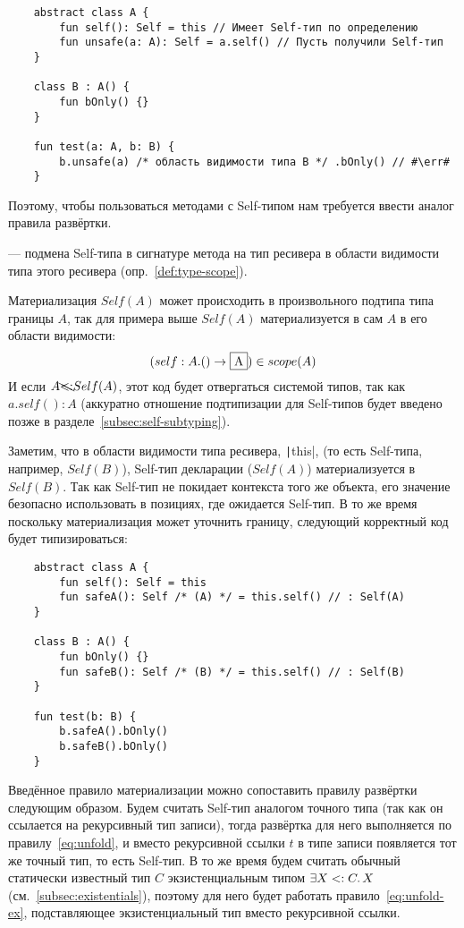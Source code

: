\begin{verbatim}
    abstract class A {
        fun self(): Self = this // Имеет Self-тип по определению
        fun unsafe(a: A): Self = a.self() // Пусть получили Self-тип
    }

    class B : A() {
        fun bOnly() {}
    }

    fun test(a: A, b: B) {
        b.unsafe(a) /* область видимости типа B */ .bOnly() // #\err#
    }
\end{verbatim}

Поэтому, чтобы пользоваться методами с Self-типом нам требуется ввести аналог правила развёртки.

\begin{definition}
    \label{def:materialization}
     --- подмена Self-типа в сигнатуре метода на тип ресивера в области видимости типа этого ресивера (опр.~\ref{def:type-scope}).
\end{definition}

Материализация $Self(A)$ может происходить в произвольного подтипа типа границы $A$, так для примера выше $Self(A)$ материализуется в сам $A$ в его области видимости:
\[(self : A.() \to \framebox{A}) \in scope(A)\]
И если $A \bcancel{<:} Self(A)$, этот код будет отвергаться системой типов, так как $a.self() : A$ (аккуратно отношение подтипизации для Self-типов будет введено позже в разделе~\ref{subsec:self-subtyping}).

Заметим, что в области видимости типа ресивера, \texttt|this|, (то есть Self-типа, например, $Self(B)$), Self-тип декларации ($Self(A)$) материализуется в $Self(B)$.
Так как Self-тип не покидает контекста того же объекта, его значение безопасно использовать в позициях, где ожидается Self-тип.
В то же время поскольку материализация может уточнить границу, следующий корректный код будет типизироваться:

\begin{verbatim}
    abstract class A {
        fun self(): Self = this
        fun safeA(): Self /* (A) */ = this.self() // : Self(A)
    }

    class B : A() {
        fun bOnly() {}
        fun safeB(): Self /* (B) */ = this.self() // : Self(B)
    }

    fun test(b: B) {
        b.safeA().bOnly()
        b.safeB().bOnly()
    }
\end{verbatim}

Введённое правило материализации можно сопоставить правилу развёртки следующим образом.
Будем считать Self-тип аналогом точного типа (так как он ссылается на рекурсивный тип записи), тогда развёртка для него выполняется по правилу~\eqref{eq:unfold}, и вместо рекурсивной ссылки $t$ в типе записи появляется тот же точный тип, то есть Self-тип.
В то же время будем считать обычный статически известный тип $C$ экзистенциальным типом $\exists X <: C \ldotp X$ (см.~\ref{subsec:existentials}), поэтому для него будет работать правило~\eqref{eq:unfold-ex}, подставляющее экзистенциальный тип вместо рекурсивной ссылки.


